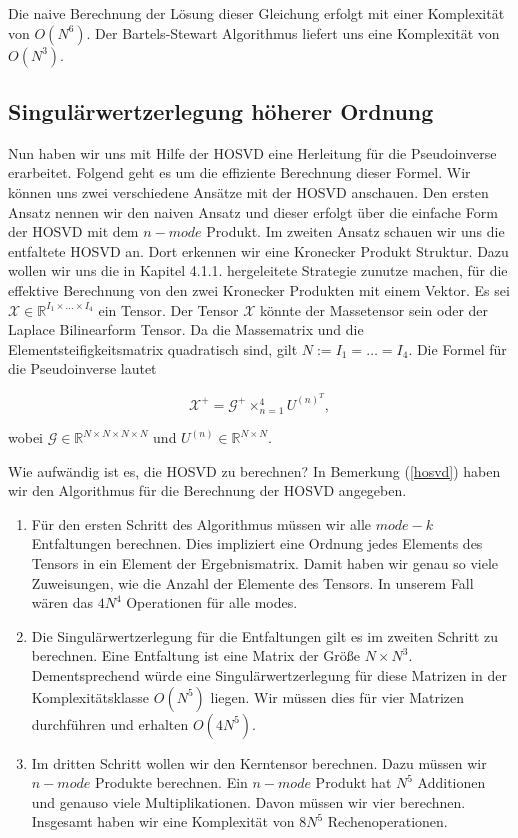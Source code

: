 Die naive Berechnung der Lösung dieser Gleichung erfolgt mit einer Komplexität von $O(N^6)$. Der Bartels-Stewart Algorithmus \cite{Bartels} liefert uns eine Komplexität von $O(N^3)$. 

\subsection{Singulärwertzerlegung höherer Ordnung}
Nun haben wir uns mit Hilfe der HOSVD eine Herleitung für die Pseudoinverse erarbeitet. Folgend geht es um die effiziente Berechnung dieser Formel. Wir können uns zwei verschiedene Ansätze mit der HOSVD anschauen. Den ersten Ansatz nennen wir den naiven Ansatz und dieser erfolgt über die einfache Form der HOSVD mit dem $n-mode$ Produkt. Im zweiten Ansatz schauen wir uns die entfaltete HOSVD an. Dort erkennen wir eine Kronecker Produkt Struktur. Dazu wollen wir uns die in Kapitel 4.1.1. hergeleitete Strategie zunutze machen, für die effektive Berechnung von den zwei Kronecker Produkten mit einem Vektor.
Es sei $\mathscr{X} \in \mathbb{R}^{I_1 \times \dots \times I_{4}}$ ein Tensor. Der Tensor $\mathscr{X}$ könnte der Massetensor sein oder der Laplace Bilinearform Tensor. Da die Massematrix und die Elementsteifigkeitsmatrix quadratisch sind, gilt $N:= I_1 = \dots = I_4$.
Die Formel für die Pseudoinverse lautet

\begin{equation} \label{eq:pinv}
\mathscr{X}^{+} = \mathscr{G}^{+} \times_{n=1}^{4} U^{ (n) ^{T} },
\end{equation}

wobei $\mathscr{G} \in \mathbb{R}^{N \times N \times N \times N}$ und $U^{(n)} \in \mathbb{R}^{N \times N}$.

Wie aufwändig ist es, die HOSVD zu berechnen?
In Bemerkung (\ref{hosvd}) haben wir den Algorithmus für die Berechnung der HOSVD angegeben. 
\begin{enumerate}
\item Für den ersten Schritt des Algorithmus müssen wir alle $mode-k$ Entfaltungen berechnen. Dies impliziert eine Ordnung jedes Elements des Tensors in ein Element der Ergebnismatrix. Damit haben wir genau so viele Zuweisungen, wie die Anzahl der Elemente des Tensors. In unserem Fall wären das $4N^4$ Operationen für alle modes. 

\item Die Singulärwertzerlegung für die Entfaltungen gilt es im zweiten Schritt zu berechnen. Eine Entfaltung ist eine Matrix der Größe $N \times N^3$. Dementsprechend würde eine Singulärwertzerlegung für diese Matrizen in der Komplexitätsklasse $O(N^5)$ liegen. Wir müssen dies für vier Matrizen durchführen und erhalten $O(4N^5)$.

\item Im dritten Schritt wollen wir den Kerntensor berechnen. Dazu müssen wir $n-mode$ Produkte berechnen. Ein $n-mode$ Produkt hat $N^5$ Additionen und genauso viele Multiplikationen. Davon müssen wir vier berechnen. Insgesamt haben wir eine Komplexität von $8N^5$ Rechenoperationen.

\end{enumerate}

